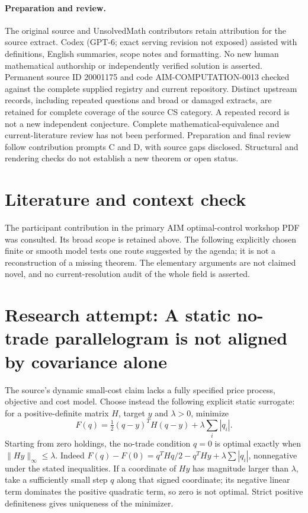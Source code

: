 \documentclass[11pt]{article}
\begin{document}
\paragraph{Preparation and review.}
The original source and UnsolvedMath contributors retain attribution for the source extract. Codex (GPT-6; exact serving revision not exposed) assisted with definitions, English summaries, scope notes and formatting. No new human mathematical authorship or independently verified solution is asserted. Permanent source ID 20001175 and code AIM-COMPUTATION-0013 checked against the complete supplied registry and current repository. Distinct upstream records, including repeated questions and broad or damaged extracts, are retained for complete coverage of the source CS category. A repeated record is not a new independent conjecture. Complete mathematical-equivalence and current-literature review has not been performed. Preparation and final review follow contribution prompts C and D, with source gaps disclosed. Structural and rendering checks do not establish a new theorem or open status.
\label{end:20001175}

\section{Literature and context check}
The participant contribution in the primary AIM optimal-control workshop
 PDF was consulted. Its broad scope is retained above. The following explicitly
 chosen finite or smooth model tests one route suggested by the agenda; it is
 not a reconstruction of a missing theorem. The elementary arguments are not
 claimed novel, and no current-resolution audit of the whole field is asserted.
\section{Research attempt: A static no-trade parallelogram is not aligned by covariance alone}
The source's dynamic small-cost claim lacks a fully specified price process,
objective and cost model. Choose instead the following explicit static surrogate:
for a positive-definite matrix $H$, target $y$ and $\lambda>0$, minimize
\[
 F(q)=\tfrac12(q-y)^TH(q-y)+\lambda\sum_i|q_i|.
\]
Starting from zero holdings, the no-trade condition $q=0$ is optimal exactly
when $\|Hy\|_\infty\le\lambda$. Indeed
$F(q)-F(0)=q^THq/2-q^THy+\lambda\sum|q_i|$, nonnegative under the stated
inequalities. If a coordinate of $Hy$ has magnitude larger than $\lambda$,
take a sufficiently small step $q$ along that signed coordinate; its negative
linear term dominates the positive quadratic term, so zero is not optimal.
Strict positive definiteness gives uniqueness of the minimizer.
\end{document}
